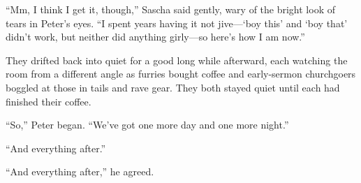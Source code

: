 ``Mm, I think I get it, though,'' Sascha said gently, wary of the bright look of tears in Peter's eyes. ``I spent years having it not jive---`boy this' and `boy that' didn't work, but neither did anything girly---so here's how I am now.''

They drifted back into quiet for a good long while afterward, each watching the room from a different angle as furries bought coffee and early-sermon churchgoers boggled at those in tails and rave gear. They both stayed quiet until each had finished their coffee.

``So,'' Peter began. ``We've got one more day and one more night.''

``And everything after.''

``And everything after,'' he agreed.

